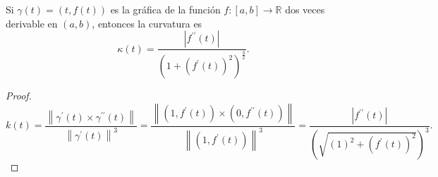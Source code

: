 \begin{frame}
    \begin{theorem}
        Si
        \begin{math}
            \gamma\left(t\right)=
            \left(
            t,
            f\left(t\right)
            \right)
        \end{math}
        es la gráfica de la función
        \begin{math}
            f\colon
            \left[a,b\right]\to
            \mathbb{R}
        \end{math}
        dos veces derivable en
        $\left(a,b\right)$, entonces la curvatura es
        \begin{equation*}
            \kappa\left(t\right)=
            \dfrac{
                \left|
                f^{\prime\prime}
                \left(t\right)
                \right|
            }{
                {\left(
                        1+
                        {\left(f^{\prime}\left(t\right)\right)}^{2}
                        \right)}^{\frac{3}{2}}
            }.
        \end{equation*}
    \end{theorem}

    \begin{proof}
        \begin{equation*}
            k\left(t\right)=
            \dfrac{
                \left\|
                \gamma^{\prime}\left(t\right)\times
                \gamma^{\prime\prime}\left(t\right)
                \right\|
            }{
                {\left\|
                        \gamma^{\prime}\left(t\right)
                        \right\|}^{3}
            }=
            \dfrac{
                \left\|
                \left(
                1,f^{\prime}\left(t\right)
                \right)\times
                \left(
                0,f^{\prime\prime}\left(t\right)
                \right)
                \right\|
            }{
                {\left\|
                        \left(
                        1,f^{\prime}\left(t\right)
                        \right)
                        \right\|}^{3}
            }=
            \dfrac{
                \left|
                f^{\prime\prime}
                \left(t\right)
                \right|
            }{
                {\left(
                        \sqrt{
                            {\left(1\right)}^{2}+
                            {\left(f^{\prime}\left(t\right)\right)}^{2}
                        }
                        \right)}^{3}
            }.
        \end{equation*}
    \end{proof}
\end{frame}
